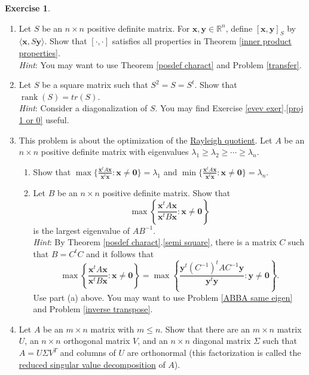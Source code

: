 \documentclass[12pt,letterpaper]{book}
\numberwithin{equation}{section}
\theoremstyle{definition}
\newtheorem{exercise}{\textbf{Exercise}}[chapter]
\newcommand{\vx}{\bm{x}}
\newcommand{\vy}{\bm{y}}
\newcommand{\veczero}{\bm{0}}
\newcommand{\rank}{\operatorname{rank}}
\begin{document}
\begin{exercise}
\begin{enumerate}[\bfseries 1.]
\item Let $S$ be an $n\times n$ positive definite matrix. For $\vx,\vy\in \mathbb{R}^n$, define $[\vx,\vy]_S$ by $\langle \vx, S\vy\rangle$. Show that $[\cdot,\cdot]$ satisfies all properties in Theorem \ref{inner product properties}.\\
\textit{Hint}: You may want to use Theorem \ref{posdef charact} and Problem \ref{transfer}.

\item Let $S$ be a square matrix such that $S^2=S=S^t$. Show that $\rank(S)=tr(S)$.
\\\textit{Hint}: Consider a diagonalization of $S$. You may find Exercise \ref{evev exer}.\ref{proj 1 or 0} useful.

\item This problem is about the optimization of the \underline{Rayleigh quotient}. Let $A$ be an $n\times n$ positive definite matrix with eigenvalues $\lambda_1\geq \lambda_2\geq \cdots \geq \lambda_n$.
\begin{enumerate}
\item Show that $\max\{\frac{\vx^t A\vx}{\vx^t\vx}: \vx\neq \veczero\}=\lambda_1$ and $\min\{\frac{\vx^t A\vx}{\vx^t\vx}: \vx\neq \veczero\}=\lambda_n$.
\item Let $B$ be an $n\times n$ positive definite matrix. Show that
$$\max\left\{\frac{\vx^t A\vx}{\vx^tB\vx}: \vx\neq \veczero\right\}$$
is the largest eigenvalue of $AB^{-1}$. \\\textit{Hint}: By Theorem \ref{posdef charact}.\ref{semi square}, there is a matrix $C$ such that $B=C^tC$ and it follows that
$$\max\left\{\frac{\vx^t A\vx}{\vx^tB\vx}: \vx\neq \veczero\right\}=\max\left\{\frac{\vy^t (C^{-1})^tAC^{-1}\vy}{\vy^t\vy}: \vy\neq \veczero\right\}.$$
Use part (a) above. You may want to use Problem \ref{ABBA same eigen} and Problem \ref{inverse transpose}.
\end{enumerate}

\item Let $A$ be an $m\times n$ matrix with $m\leq n$. Show that there are an $m\times n$ matrix $U$, an $n\times n$ orthogonal matrix $V$, and an $n\times n$ diagonal matrix $\Sigma$ such that $A=U\Sigma V^T$ and columns of $U$ are orthonormal (this factorization is called the \underline{reduced singular value decomposition} of $A$).

\end{enumerate}
\end{exercise}
\end{document}
